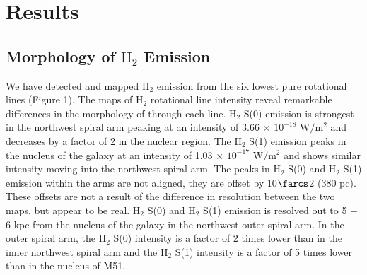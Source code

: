 \documentclass[manuscript]{aastex}
\begin{document}
\section{Results}

\subsection{Morphology of $\mathrm{H_2}$ Emission}

We have detected and mapped $\mathrm{H_2}$ emission from the six lowest pure rotational lines (Figure 1).  The maps of $\mathrm{H_2}$ rotational line intensity reveal remarkable differences in the morphology of  through each line.  $\mathrm{H_2}$ S(0) emission is strongest in the northwest spiral arm peaking at an intensity of 3.66 $\times$ $\mathrm{10^{-18}}$ $\mathrm{W/m^2}$ and decreases by a factor of 2 in the nuclear region.  The $\mathrm{H_2}$ S(1) emission peaks in the nucleus of the galaxy at an intensity of 1.03 $\times$ $\mathrm{10^{-17}}$ $\mathrm{W/m^2}$  and shows similar intensity moving into the northwest spiral arm.  The peaks in $\mathrm{H_2}$ S(0) and $\mathrm{H_2}$ S(1) emission within the arms are not aligned, they are offset by 10$\farcs$2 (380 pc).  These offsets are not a result of the difference in resolution between the two maps, but appear to be real. $\mathrm{H_2}$ S(0) and $\mathrm{H_2}$ S(1) emission is resolved out to 5 $-$ 6 kpc from the nucleus of the galaxy in the northwest outer spiral arm.  In the outer spiral arm, the $\mathrm{H_2}$ S(0) intensity 
is a factor of 2 times lower than in the inner northwest spiral arm and the $\mathrm{H_2}$ S(1) intensity is a factor of 5 times lower than in the nucleus of M51.
 
\end{document}
